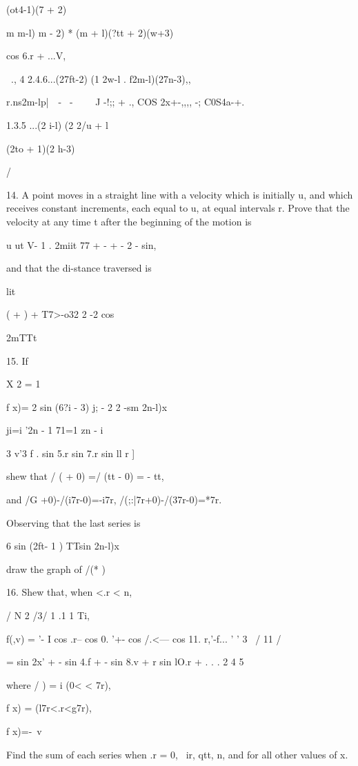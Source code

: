 {(ot4-1)(7 + 2)

m m-l) m - 2) * (m + l)(?tt + 2)(w+3)

cos 6.r + ...V,

  \ ., 4 2.4.6...(27ft-2) (1 2w-l . f2m-l)(27n-3),,

r.ns2m-l\;p|\ \ - \ - \ \ \ \ J -!;; + ., COS 2x+-,,,, -;
C0S4a-+.

1.3.5 ...(2 i-l) (2 2/u + l

(2to + 1)(2 h-3)

/

14. A point moves in a straight line with a velocity which is
initially u, and which receives constant increments, each equal to u,
at equal intervals r. Prove that the velocity at any time t after the
beginning of the motion is

u ut V- 1 . 2miit 77 + - + - 2 - sin,

and that the di-stance traversed is

lit

( + ) + T7>-o32 2 -2 cos

2mTTt


%
%

15. If

X 2 = 1

f x)= 2 sin (6?i - 3) j; - 2 2 -sm 2n-l)x

ji=i '2n - 1 71=1 zn - i

3 v'3 f . sin 5.r sin 7.r sin ll r ]

shew that / ( + 0) =/ (tt - 0) = - tt,

and /G +0)-/(i7r-0)=-i7r, /(;:|7r+0)-/(37r-0)=*7r.

Observing that the last series is

6 sin (2ft- 1 ) TTsin 2n-l)x

draw the graph of /(* ) 

16. Shew that, when <.r < n,

 / N 2 /3/ 1 .1 1 Ti, \

f(,v) = '- I cos .r-- cos 0. '+- cos /.<--- cos 11. r,'-f... ' ' 3 \
/ 11 /

= sin 2x' + - sin 4.f + - sin 8.v + r sin lO.r + . . . 2 4 5

where / ) = i (0< < 7r),

f x) = (l7r<.r<g7r),

f x)=-\ v %

Find the sum of each series when .r = 0, \ ir, qtt, n, and for all
other values of x.

}
